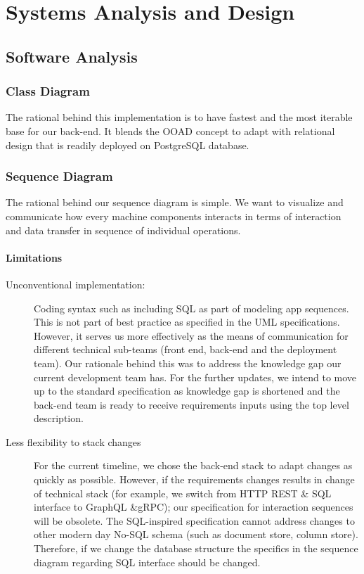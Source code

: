 %
%
\chapter{Systems Analysis and Design}

\section{Software Analysis}

\subsection{Class Diagram}

The rational behind this implementation is to have fastest and the most iterable base for our back-end. It blends the OOAD concept to adapt with relational design that is readily deployed on PostgreSQL database.


\subsection{Sequence Diagram}

The rational behind our sequence diagram is simple. We want to visualize and communicate how every machine components interacts in terms of interaction and data transfer in sequence of individual operations.


\subsubsection{Limitations}

\begin{description}
	\item[Unconventional implementation:] Coding syntax such as including SQL as part of modeling app sequences. This is not part of best practice as specified in the UML specifications. However, it serves us more effectively as the means of communication for different technical sub-teams (front end, back-end and the deployment team). Our rationale behind this was to address the knowledge gap our current development team has. For the further updates, we intend to move up to the standard specification as knowledge gap is shortened and the back-end team is ready to receive requirements inputs using the top level description.
	\item[Less flexibility to stack changes] For the current timeline, we chose the back-end stack to adapt changes as quickly as possible. However, if the requirements changes results in change of technical stack (for example, we switch from HTTP REST \& SQL interface to GraphQL \&gRPC); our specification for interaction sequences will be obsolete. The SQL-inspired specification cannot address changes to other modern day No-SQL schema (such as document store, column store). Therefore, if we change the database structure the specifics in the sequence diagram regarding SQL interface should be changed.
\end{description}

